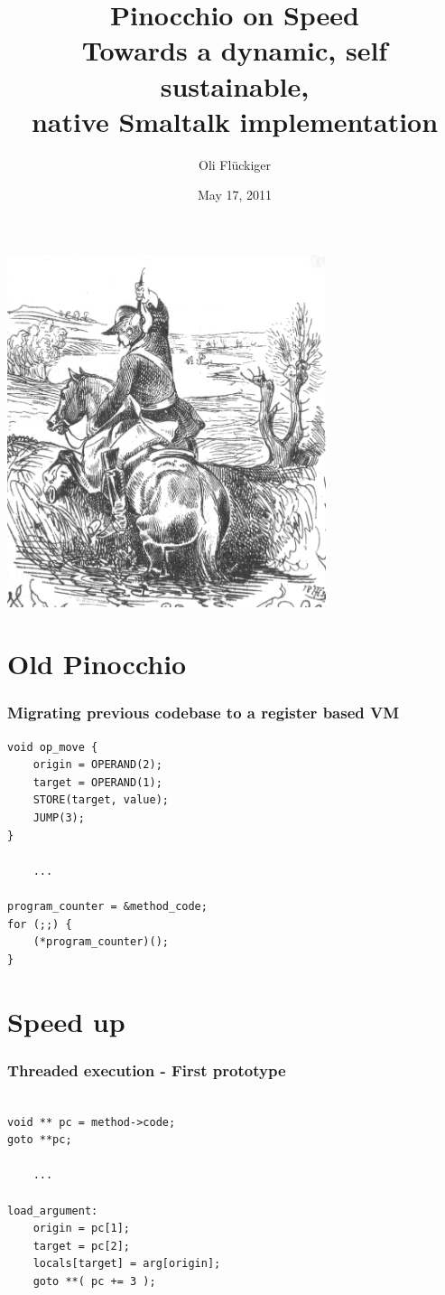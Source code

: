 \documentclass{beamer}
\title[Pinocchio on Speed]{Pinocchio on Speed \\ Towards a dynamic, self sustainable, \\native Smaltalk implementation}
\author{Oli Flückiger}
\institute{scg.unibe.ch}
\date{May 17, 2011}
\begin{document}
\begin{frame}
\titlepage
\end{frame}

\begin{frame}
\begin{center}\includegraphics[width=0.7\textwidth]{muenchhausen.png}\end{center}
\end{frame}

\section{Old Pinocchio}

\lstset{language=C}

\begin{frame}[fragile]
    \frametitle{Migrating previous codebase to a register based VM}
    \begin{lstlisting}
void op_move {
    origin = OPERAND(2);
    target = OPERAND(1);
    STORE(target, value);
    JUMP(3);
}

    ...

program_counter = &method_code;
for (;;) {
    (*program_counter)();
}
    \end{lstlisting}
\end{frame}

\section{Speed up}

\begin{frame}[fragile]
    \frametitle{Threaded execution - First prototype}
    \begin{lstlisting}

void ** pc = method->code;
goto **pc;
            
    ...

load_argument:
    origin = pc[1];
    target = pc[2];
    locals[target] = arg[origin];
    goto **( pc += 3 );

    \end{lstlisting}
\end{frame}
\end{document}
